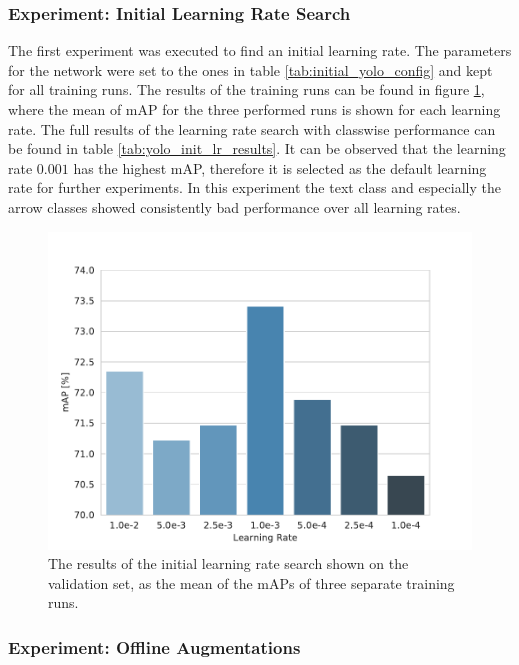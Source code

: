 \subsubsection{Experiment: Initial Learning Rate Search}

The first experiment was executed to find an initial learning rate.
The parameters for the network were set to the ones in table \ref{tab:initial_yolo_config} and kept for all training runs.
The results of the training runs can be found in figure \ref{fig:yolo_lr_experiment_results}, where the mean of mAP for the three performed runs is shown for each learning rate.
The full results of the learning rate search with classwise performance can be found in table \ref{tab:yolo_init_lr_results}.
It can be observed that the learning rate $0.001$ has the highest \ac{mAP}, therefore it is selected as the default learning rate for further experiments.
In this experiment the text class and especially the arrow classes showed consistently bad performance over all learning rates.

\begin{figure}
\begin{center}
    \includegraphics[width=13cm]{imgs/yolo_lr_experiment.pdf}
    \caption{The results of the initial learning rate search shown on the validation set, as the mean of the mAPs of three separate training runs.}
    \label{fig:yolo_lr_experiment_results}
\end{center}
\end{figure}


\subsubsection{Experiment: Offline Augmentations}


